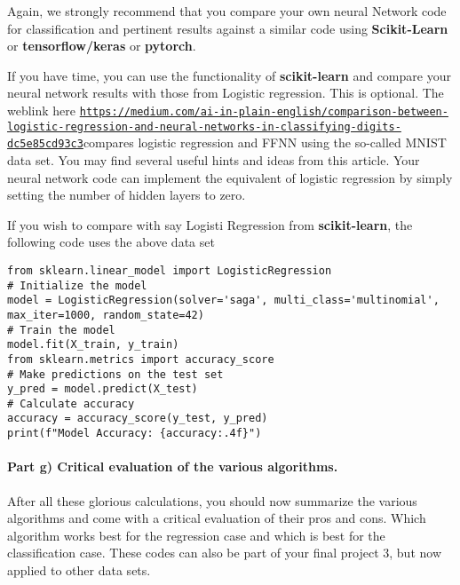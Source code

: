 \documentclass[%
oneside,                 %
final,                   %
10pt]{article}
\begin{document}
Again, we strongly recommend that you compare your own neural Network
code for classification and pertinent results against a similar code using \textbf{Scikit-Learn}  or \textbf{tensorflow/keras} or \textbf{pytorch}.

If you have time, you can use the functionality of \textbf{scikit-learn} and compare your neural network results with those from Logistic regression. This is optional.
The weblink  here \href{{https://medium.com/ai-in-plain-english/comparison-between-logistic-regression-and-neural-networks-in-classifying-digits-dc5e85cd93c3}}{\nolinkurl{https://medium.com/ai-in-plain-english/comparison-between-logistic-regression-and-neural-networks-in-classifying-digits-dc5e85cd93c3}}compares logistic regression and FFNN using the so-called MNIST data set. You may find several useful hints and ideas from this article. Your neural network code can implement the equivalent of logistic regression by simply setting the number of hidden layers to zero. 

If you wish to compare with say Logisti Regression from \textbf{scikit-learn}, the following code uses the above data set












\begin{verbatim}
from sklearn.linear_model import LogisticRegression
# Initialize the model
model = LogisticRegression(solver='saga', multi_class='multinomial', max_iter=1000, random_state=42)
# Train the model
model.fit(X_train, y_train)
from sklearn.metrics import accuracy_score
# Make predictions on the test set
y_pred = model.predict(X_test)
# Calculate accuracy
accuracy = accuracy_score(y_test, y_pred)
print(f"Model Accuracy: {accuracy:.4f}")

\end{verbatim}


\paragraph{Part g) Critical evaluation of the various algorithms.}
After all these glorious calculations, you should now summarize the
various algorithms and come with a critical evaluation of their pros
and cons. Which algorithm works best for the regression case and which
is best for the classification case. These codes can also be part of
your final project 3, but now applied to other data sets.
\end{document}
